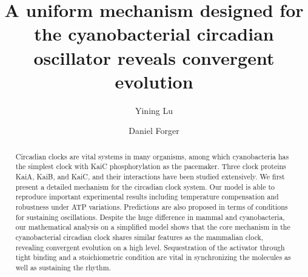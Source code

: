 \documentclass[a4paper,10pt]{article}
\title{A uniform mechanism designed for the cyanobacterial circadian oscillator reveals convergent evolution}
\author{Yining Lu}
\author{Daniel Forger}
\affil{Department of Mathematics,\\University of Michigan}
\date{}
\numberwithin{equation}{section}
\begin{document}
\maketitle

\begin{abstract}
Circadian clocks are vital systems in many organisms, among which cyanobacteria has the simplest clock with KaiC phosphorylation as the pacemaker. Three clock proteins KaiA, KaiB, and KaiC, and their interactions have been studied extensively. We first present a detailed  mechanism for the circadian clock system. Our model is able to reproduce important experimental results including temperature compensation and robustness under ATP variations. Predictions are also proposed in terms of conditions for sustaining oscillations. Despite the huge difference in mammal and cyanobacteria, our mathematical analysis on a simplified model shows that the core mechanism in the cyanobacterial circadian clock shares similar features as the mammalian clock, revealing convergent evolution on a high level. Sequestration of the activator through tight binding and a stoichiometric condition are vital in synchronizing the molecules as well as sustaining the rhythm. 
\end{abstract}
\end{document}
